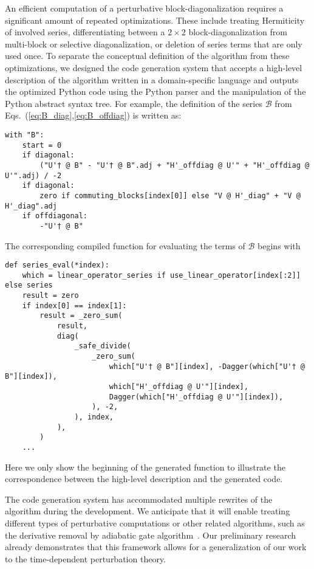 An efficient computation of a perturbative block-diagonalization requires a significant amount of repeated optimizations.
These include treating Hermiticity of involved series, differentiating between a $2\times 2$ block-diagonalization from multi-block or selective diagonalization, or deletion of series terms that are only used once.
To separate the conceptual definition of the algorithm from these optimizations, we designed the code generation system that accepts a high-level description of the algorithm written in a domain-specific language and outputs the optimized Python code using the Python parser and the manipulation of the Python abstract syntax tree.
For example, the definition of the series $\mathcal{B}$ from Eqs.~(\ref{eq:B_diag},\ref{eq:B_offdiag}) is written as:
\begin{verbatim}
with "B":
    start = 0
    if diagonal:
        ("U'† @ B" - "U'† @ B".adj + "H'_offdiag @ U'" + "H'_offdiag @ U'".adj) / -2
    if diagonal:
        zero if commuting_blocks[index[0]] else "V @ H'_diag" + "V @ H'_diag".adj
    if offdiagonal:
        -"U'† @ B"
\end{verbatim}
The corresponding compiled function for evaluating the terms of $\mathcal{B}$ begins with
\begin{verbatim}
def series_eval(*index):
    which = linear_operator_series if use_linear_operator[index[:2]] else series
    result = zero
    if index[0] == index[1]:
        result = _zero_sum(
            result,
            diag(
                _safe_divide(
                    _zero_sum(
                        which["U'† @ B"][index], -Dagger(which["U'† @ B"][index]),
                        which["H'_offdiag @ U'"][index],
                        Dagger(which["H'_offdiag @ U'"][index]),
                    ), -2,
                ), index,
            ),
        )
    ...
\end{verbatim}
Here we only show the beginning of the generated function to illustrate the correspondence between the high-level description and the generated code.

The code generation system has accommodated multiple rewrites of the algorithm during the development.
We anticipate that it will enable treating different types of perturbative computations or other related algorithms, such as the derivative removal by adiabatic gate algorithm~\cite{Motzoi_2009,Theis_2018}.
Our preliminary research already demonstrates that this framework allows for a generalization of our work to the time-dependent perturbation theory.
